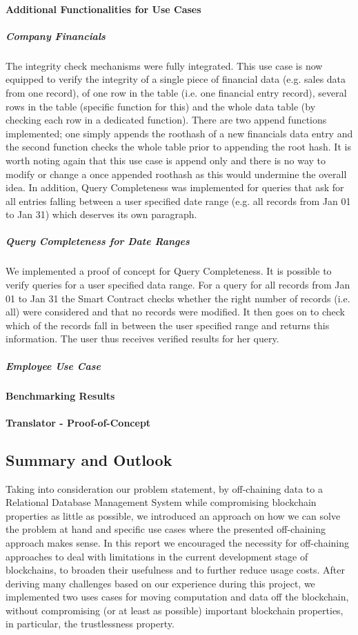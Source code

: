 \paragraph{Additional Functionalities for Use Cases}
\subparagraph{Company Financials}
The integrity check mechanisms were fully integrated. This use case is now equipped to verify the integrity of a single piece of financial data (e.g. sales data from one record), of one row in the table (i.e. one financial entry record), several rows in the table (specific function for this) and the whole data table (by checking each row in a dedicated function).
There are two append functions implemented; one simply appends the roothash of a new financials data entry and the second function checks the whole table prior to appending the root hash. It is worth noting again that this use case is append only and there is no way to modify or change a once appended roothash as this would undermine the overall idea.
In addition, Query Completeness was implemented for queries that ask for all entries falling between a user specified date range (e.g. all records from Jan 01 to Jan 31) which deserves its own paragraph.

\subparagraph{Query Completeness for Date Ranges}
We implemented a proof of concept for Query Completeness. It is possible to verify queries for a user specified data range. For a query for all records from Jan 01 to Jan 31 the Smart Contract checks whether the right number of records (i.e. all) were considered and that no records were modified. It then goes on to check which of the records fall in between the user specified range and returns this information. The user thus receives verified results for her query.

\subparagraph{Employee Use Case}

\paragraph{Benchmarking Results}

\paragraph{Translator - Proof-of-Concept}


\subsection{Summary and Outlook}
Taking into consideration our problem statement, by off-chaining data to a Relational Database Management System while compromising blockchain properties as little as possible, we introduced an approach on how we can solve the problem at hand and specific use cases where the presented off-chaining approach makes sense. In this report we encouraged the necessity for off-chaining approaches to deal with limitations in the current development stage of blockchains, to broaden their usefulness and to further reduce usage costs. After deriving many challenges based on our experience during this project, we implemented two uses cases for moving computation and data off the blockchain, without compromising (or at least as possible) important blockchain properties, in particular, the trustlessness property.

